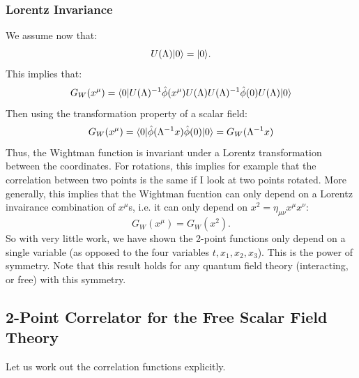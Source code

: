\subsubsection*{Lorentz Invariance}
We assume now that:
\begin{equation}
    U(\Lambda)\lvert 0 \rangle = \lvert 0 \rangle.
\end{equation}
This implies that:
\begin{equation}
    G_W(x^\mu) = \langle 0 \rvert U(\Lambda)^{-1}\hat{\phi}(x^\mu)U(\Lambda)U(\Lambda)^{-1}\hat{\phi}(0)U(\Lambda)\lvert 0 \rangle
\end{equation}
Then using the transformation property of a scalar field:
\begin{equation}
    G_W(x^\mu) = \langle 0 \rvert\hat{\phi}(\Lambda^{-1}x)\hat{\phi}(0)\lvert 0 \rangle = G_W(\Lambda^{-1}x)
\end{equation}
Thus, the Wightman function is invariant under a Lorentz transformation between the coordinates. For rotations, this implies for example that the correlation between two points is the same if I look at two points rotated. More generally, this implies that the Wightman fucntion can only depend on a Lorentz invairance combination of $x^\mu$s, i.e. it can only depend on $x^2 = \eta_{\mu\nu}x^\mu x^\nu$:
\begin{equation}
    G_W(x^\mu) = G_W(x^2).
\end{equation}
So with very little work, we have shown the 2-point functions only depend on a single variable (as opposed to the four variables $t, x_1, x_2, x_3$). This is the power of symmetry. Note that this result holds for any quantum field theory (interacting, or free) with this symmetry.

\subsection{2-Point Correlator for the Free Scalar Field Theory}
Let us work out the correlation functions explicitly. 

